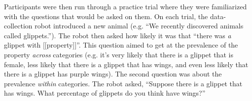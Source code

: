 \documentclass[10pt,letterpaper]{article}
\begin{document}
Participants were then run through a practice trial where they were familiarized with the questions that would be asked on them. 
On each trial, the data-collection robot introduced a new animal (e.g. ``We recently discovered animals called glippets.''). 
The robot then asked how likely it was that ``there was \emph{a} glippet with [[property]]''. 
This question aimed to get at the prevalence of the property \emph{across} categories (e.g. it's very likely that there is a glippet that is female, less likely that there is a glippet that has wings, and even less likely that there is a glippet has purple wings). 
The second question was about the prevalence \emph{within} categories. The robot asked, ``Suppose there is a glippet that has wings. What percentage of glippets do you think have wings?''





\setlength{\bibleftmargin}{.125in}
\setlength{\bibindent}{-\bibleftmargin}


\end{document}
